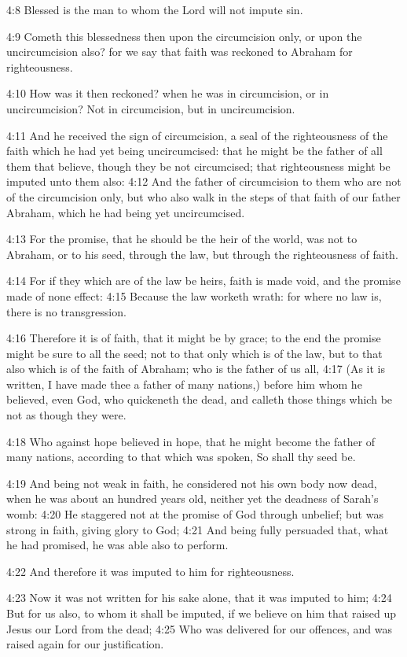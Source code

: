 4:8 Blessed is the man to whom the Lord will not impute sin.

4:9 Cometh this blessedness then upon the circumcision only, or upon the uncircumcision also? for we say that faith was reckoned to Abraham for righteousness.

4:10 How was it then reckoned? when he was in circumcision, or in uncircumcision? Not in circumcision, but in uncircumcision.

4:11 And he received the sign of circumcision, a seal of the righteousness of the faith which he had yet being uncircumcised: that he might be the father of all them that believe, though they be not circumcised; that righteousness might be imputed unto them also: 4:12 And the father of circumcision to them who are not of the circumcision only, but who also walk in the steps of that faith of our father Abraham, which he had being yet uncircumcised.

4:13 For the promise, that he should be the heir of the world, was not to Abraham, or to his seed, through the law, but through the righteousness of faith.

4:14 For if they which are of the law be heirs, faith is made void, and the promise made of none effect: 4:15 Because the law worketh wrath: for where no law is, there is no transgression.

4:16 Therefore it is of faith, that it might be by grace; to the end the promise might be sure to all the seed; not to that only which is of the law, but to that also which is of the faith of Abraham; who is the father of us all, 4:17 (As it is written, I have made thee a father of many nations,) before him whom he believed, even God, who quickeneth the dead, and calleth those things which be not as though they were.

4:18 Who against hope believed in hope, that he might become the father of many nations, according to that which was spoken, So shall thy seed be.

4:19 And being not weak in faith, he considered not his own body now dead, when he was about an hundred years old, neither yet the deadness of Sarah's womb: 4:20 He staggered not at the promise of God through unbelief; but was strong in faith, giving glory to God; 4:21 And being fully persuaded that, what he had promised, he was able also to perform.

4:22 And therefore it was imputed to him for righteousness.

4:23 Now it was not written for his sake alone, that it was imputed to him; 4:24 But for us also, to whom it shall be imputed, if we believe on him that raised up Jesus our Lord from the dead; 4:25 Who was delivered for our offences, and was raised again for our justification.

